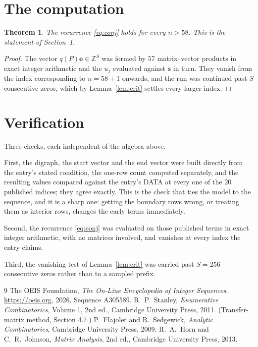 \documentclass[11pt,a4paper]{article}
\theoremstyle{plain}
\newtheorem{theorem}{Theorem}
\theoremstyle{definition}
\begin{document}
\section{The computation}

\begin{theorem}
The recurrence \eqref{eq:conj} holds for every $n>58$. This is the statement of
Section~1.
\end{theorem}

\begin{proof}
The vector $q(P)\mathbf{e}\in\mathbb{Z}^{S}$ was formed by $57$ matrix--vector
products in exact integer arithmetic and the $u_j$ evaluated against $\mathbf{s}$ in turn.
They vanish from the index corresponding to $n=58+1$ onwards, and the run was continued
past $S$ consecutive zeros, which by Lemma~\ref{lem:crit} settles every larger index.
\end{proof}

\section{Verification}

Three checks, each independent of the algebra above.

First, the digraph, the start vector and the end vector were built directly from the
entry's stated condition, the one-row count computed separately, and the resulting values
compared against the entry's DATA at every one of the $20$ published indices; they
agree exactly. This is the check that ties the model to the sequence, and it is a sharp one:
getting the boundary rows wrong, or treating them as interior rows, changes the early terms
immediately.

Second, the recurrence \eqref{eq:conj} was evaluated on those published terms in exact
integer arithmetic, with no matrices involved, and vanishes at every index the entry claims.

Third, the vanishing test of Lemma~\ref{lem:crit} was carried past $S=256$ consecutive
zeros rather than to a sampled prefix.

\begin{thebibliography}{9}
 The OEIS Foundation, \emph{The On-Line Encyclopedia of Integer
Sequences}, \url{https://oeis.org}, 2026. Sequence A305589.
 R.~P.~Stanley, \emph{Enumerative Combinatorics}, Volume 1, 2nd ed.,
Cambridge University Press, 2011. (Transfer-matrix method, Section 4.7.)
 P.~Flajolet and R.~Sedgewick, \emph{Analytic Combinatorics}, Cambridge
University Press, 2009.
 R.~A.~Horn and C.~R.~Johnson, \emph{Matrix Analysis}, 2nd ed., Cambridge
University Press, 2013.
\end{thebibliography}
\end{document}

